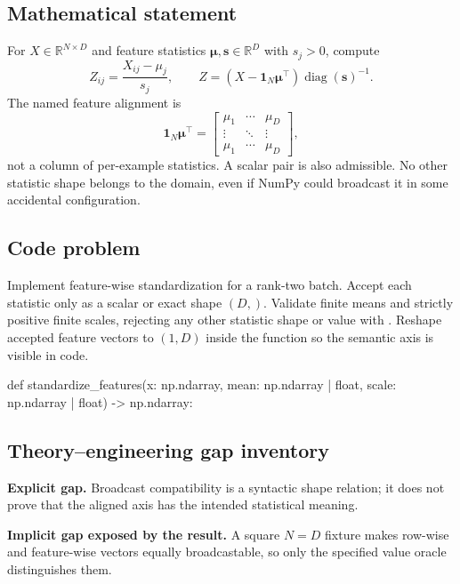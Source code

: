 
        \subsection{Mathematical statement}


For $X\in\mathbb R^{N\times D}$ and feature statistics
$\bm\mu,\bm s\in\mathbb R^D$ with $s_j>0$, compute
\[
  Z_{ij}=\frac{X_{ij}-\mu_j}{s_j},
  \qquad
  Z=(X-\bm 1_N\bm\mu^\top)\operatorname{diag}(\bm s)^{-1}.
\]
The named feature alignment is
\[
\bm 1_N\bm\mu^\top=
\left[\begin{matrix}
\mu_1 & \cdots & \mu_D\\
\vdots & \ddots & \vdots\\
\mu_1 & \cdots & \mu_D
\end{matrix}\right],
\]
not a column of per-example statistics.
A scalar pair is also admissible.  No other statistic shape belongs to the
domain, even if NumPy could broadcast it in some accidental configuration.


        \subsection{Code problem}


Implement feature-wise standardization for a rank-two batch.  Accept each
statistic only as a scalar or exact shape $(D,)$.  Validate finite means and
strictly positive finite scales, rejecting any other statistic shape or value
with .  Reshape accepted feature vectors to $(1,D)$
inside the function so the semantic axis is visible in code.


        \begin{contractbox}
        \begin{Code}
        def standardize_features(x: np.ndarray, mean: np.ndarray | float, scale: np.ndarray | float) -> np.ndarray:
        \end{Code}
        \end{contractbox}

        \subsection{Theory--engineering gap inventory}

        \begin{gapbox}
        \textbf{Explicit gap.} Broadcast compatibility is a syntactic shape relation; it does not prove that the aligned axis has the intended statistical meaning.

        \textbf{Implicit gap exposed by the result.} A square $N=D$ fixture makes row-wise and feature-wise vectors equally broadcastable, so only the specified value oracle distinguishes them.
        \end{gapbox}

